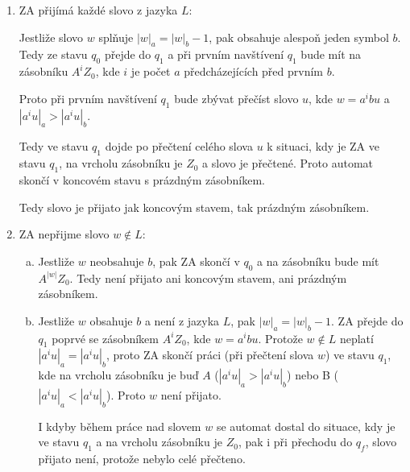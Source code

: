 \documentclass[11pt]{article}
\begin{document}
\begin{enumerate}
      \item ZA přijímá každé slovo z jazyka $L$:
      
      Jestliže slovo $w$ splňuje $|w|_a = |w|_b -1$, pak obsahuje alespoň jeden symbol $b$. Tedy ze stavu $q_0$ přejde
      do $q_1$ a při prvním navštívení $q_1$ bude mít na zásobníku $A^i Z_0$, kde $i$ je počet $a$ předcházejících před
      prvním $b$.

      Proto při prvním navštívení $q_1$ bude zbývat přečíst slovo $u$, kde $w = a^i b u$ a $|a^i u|_a > |a^i u|_b$.

      Tedy ve stavu $q_1$ dojde po přečtení celého slova $u$ k situaci, kdy je ZA ve stavu $q_1$, na vrcholu zásobníku
      je $Z_0$ a slovo je přečtené. Proto automat skončí v koncovém stavu s prázdným zásobníkem.

      Tedy slovo je přijato jak koncovým stavem, tak prázdným zásobníkem.

      \item ZA nepřijme slovo $w \not\in L$:
      
      \begin{enumerate}[a)]
            \item Jestliže $w$ neobsahuje $b$, pak ZA skončí v $q_0$ a na zásobníku bude mít $A^{|w|} Z_0$. Tedy není
            přijato ani koncovým stavem, ani prázdným zásobníkem.
            \item Jestliže $w$ obsahuje $b$ a není z jazyka $L$, pak $|w|_a = |w|_b -1$. ZA přejde do $q_1$ poprvé se
            zásobníkem $A^i Z_0$, kde $w=a^i b u$. Protože $w \not\in L$ neplatí $|a^i u|_a = |a^i u|_b$, proto ZA
            skončí práci (při přečtení slova $w$) ve stavu $q_1$, kde na vrcholu zásobníku je buď $A$ ($|a^i u|_a > |a^i u|_b$)
            nebo B ($|a^i u|_a < |a^i u|_b$). Proto $w$ není přijato.

            I kdyby během práce nad slovem $w$ se automat dostal do situace, kdy je ve stavu $q_1$ a na vrcholu zásobníku
            je $Z_0$, pak i při přechodu do $q_f$, slovo přijato není, protože nebylo celé přečteno. 
      \end{enumerate}
\end{enumerate}

 
\end{document}
